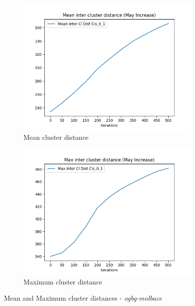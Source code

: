 		\begin{figure}[!ht]
			\centering
			\begin{subfigure}{0.49\textwidth}
				\centering
				\includegraphics[width=1.1\linewidth]{images/plotA1_InterMeanClDist_ogbgMolbaceExp1}
				\caption{Mean cluster distance}
				\label{fig:plota1intermeancldistogbgmolbaceexp1-25m}
			\end{subfigure}
			\begin{subfigure}{0.49\textwidth}
				\centering
				\includegraphics[width=1.0\linewidth]{images/plotA1_InterMaxClDist_ogbgMolbaceExp1}
				\caption{Maximum cluster distance}
				\label{fig:plota1intermaxcldistogbgmolbaceexp1}
			\end{subfigure}
			\caption{Mean and Maximum cluster distances - \textit{ogbg-molbace}}
			\label{fig:InterMeanMinMolBrace}
		\end{figure}
		
